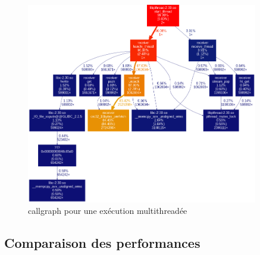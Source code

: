 \documentclass[../main.tex]{subfiles}
\begin{document}
\begin{figure}
    \includegraphics[width=0.9\textwidth]{assets/callgraph.png}
    \caption{callgraph pour une exécution multithreadée}
    \label{sec:graph_mult}
\end{figure}

\newpage

\subsection{Comparaison des performances}

\label{sec:plot_1_recv}

\label{sec:plot_mul_recv}

\label{sec:plot_max}
\end{document}
